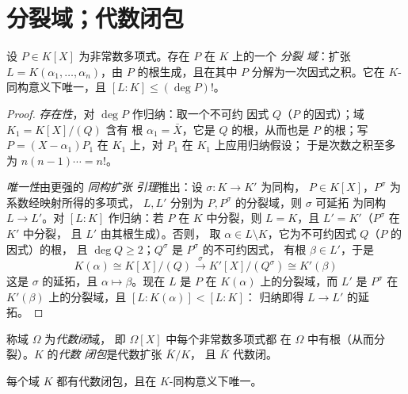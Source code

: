 \section{分裂域；代数闭包}

\begin{theorem}[分裂域]\label{thm:b3:galois:splitting}
设 $P \in K[X]$ 为非常数多项式。存在 $P$ 在 $K$ 上的一个 \emph{分裂
域}：扩张 $L =
K(\alpha_1, \dots, \alpha_n)$，由 $P$ 的根生成，且在其中
$P$ 分解为一次因式之积。它在
$K$-同构意义下唯一，且 $[L:K] \leq (\deg P)!$。
\end{theorem}

\begin{proof}
\emph{存在性}，对 $\deg P$ 作归纳：取一个不可约
因式 $Q$（$P$ 的因式）；域 $K_1 = K[X]/(Q)$ 含有
根 $\alpha_1 = \bar X$，它是 $Q$ 的根，从而也是 $P$ 的根；写 $P = (X -
\alpha_1)P_1$ 在 $K_1$ 上，对 $P_1$ 在 $K_1$ 上应用归纳假设；
于是次数之积至多为 $n(n-1)\cdots = n!$。

\emph{唯一性}由更强的 \emph{同构扩张
引理}推出：设 $\sigma \colon K \to K'$ 为同构，
$P \in K[X]$，$P^\sigma$ 为系数经映射所得的多项式，
$L, L'$ 分别为 $P, P^\sigma$ 的分裂域，则 $\sigma$ 可延拓
为同构 $L \to L'$。对 $[L:K]$ 作归纳：若 $P$ 在
$K$ 中分裂，则 $L = K$，且 $L' = K'$（$P^\sigma$ 在 $K'$ 中分裂，
且 $L'$ 由其根生成）。否则，
取 $\alpha \in L \setminus K$，它为不可约因式 $Q$（$P$ 的因式）的根，
且 $\deg Q \geq 2$；$Q^\sigma$ 是 $P^\sigma$ 的不可约因式，
有根 $\beta \in L'$，于是
\[
K(\alpha) \cong K[X]/(Q) \xrightarrow{\ \sigma\ }
K'[X]/(Q^\sigma) \cong K'(\beta)
\]
这是 $\sigma$ 的延拓，且 $\alpha \mapsto \beta$。现在 $L$ 是
$P$ 在 $K(\alpha)$ 上的分裂域，而 $L'$ 是 $P^\sigma$ 在
$K'(\beta)$ 上的分裂域，且 $[L : K(\alpha)] < [L:K]$：
归纳即得 $L \to L'$ 的延拓。
\end{proof}

\begin{definition}\label{def:b3:galois:closure}
称域 $\Omega$ 为\emph{代数闭}域，
即 $\Omega[X]$ 中每个非常数多项式都
在 $\Omega$ 中有根（从而分裂）。$K$ 的\emph{代数
闭包}是代数扩张 $\bar K/K$，
且 $\bar K$ 代数闭。
\end{definition}

\begin{theorem}[施泰尼茨]\label{thm:b3:galois:steinitz}
每个域 $K$ 都有代数闭包，且在
$K$-同构意义下唯一。
\end{theorem}

